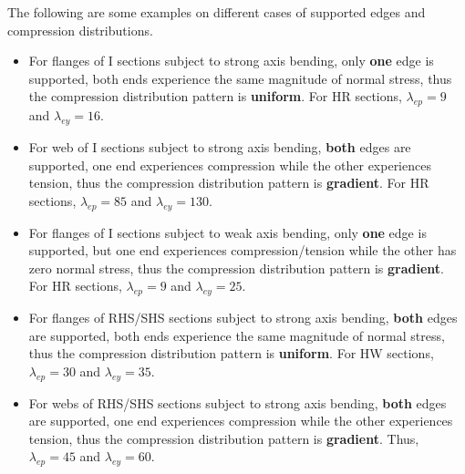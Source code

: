 The following are some examples on different cases of supported edges and compression distributions.
\begin{itemize}
\item For flanges of I sections subject to strong axis bending, only \textbf{one} edge is supported, both ends experience the same magnitude of normal stress, thus the compression distribution pattern is \textbf{uniform}. For HR sections, $\lambda_{ep}=9$ and $\lambda_{ey}=16$.
\begin{figure}[H]
\centering

\end{figure}
\item For web of I sections subject to strong axis bending, \textbf{both} edges are supported, one end experiences compression while the other experiences tension, thus the compression distribution pattern is \textbf{gradient}. For HR sections, $\lambda_{ep}=85$ and $\lambda_{ey}=130$.
\begin{figure}[H]
\centering

\end{figure}
\item For flanges of I sections subject to weak axis bending, only \textbf{one} edge is supported, but one end experiences compression/tension while the other has zero normal stress, thus the compression distribution pattern is \textbf{gradient}. For HR sections, $\lambda_{ep}=9$ and $\lambda_{ey}=25$.
\begin{figure}[H]
\centering

\end{figure}
\item For flanges of RHS/SHS sections subject to strong axis bending, \textbf{both} edges are supported, both ends experience the same magnitude of normal stress, thus the compression distribution pattern is \textbf{uniform}. For HW sections, $\lambda_{ep}=30$ and $\lambda_{ey}=35$.
\begin{figure}[H]
\centering

\end{figure}
\item For webs of RHS/SHS sections subject to strong axis bending, \textbf{both} edges are supported, one end experiences compression while the other experiences tension, thus the compression distribution pattern is \textbf{gradient}. Thus, $\lambda_{ep}=45$ and $\lambda_{ey}=60$.
\begin{figure}[H]
\centering

\end{figure}
\end{itemize}

